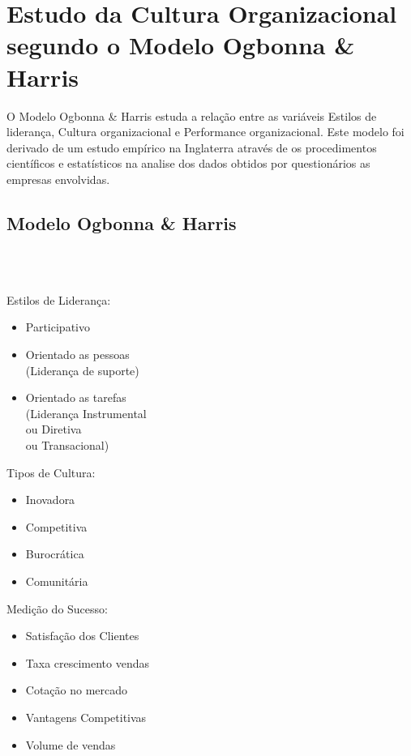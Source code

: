 \section{Estudo da Cultura Organizacional segundo o Modelo Ogbonna \& Harris}
\qquad O Modelo Ogbonna \& Harris estuda a relação entre as variáveis Estilos de liderança, Cultura organizacional e Performance organizacional. Este modelo foi derivado de um estudo empírico na Inglaterra através de os procedimentos científicos e estatísticos na analise dos dados obtidos por questionários as empresas envolvidas.\\
\subsection{Modelo Ogbonna \& Harris}
 \\
\\
\begin{minipage}[t]{.31\linewidth}
\quad Estilos de Liderança:
\begin{itemize}
\setlength\itemsep{-0.3em}
\item Participativo
\item Orientado as pessoas\\
(Liderança de suporte)
\item Orientado as tarefas\\
(Liderança Instrumental\\ ou Diretiva\\ ou Transacional)
\end{itemize}
\end{minipage}
\begin{minipage}[t]{.31\linewidth}
\quad Tipos de Cultura:
\begin{itemize}
\setlength\itemsep{-0.3em}
\item Inovadora
\item Competitiva
\item Burocrática
\item Comunitária
\end{itemize}
\end{minipage}
\begin{minipage}[t]{.31\linewidth}
\quad Medição do Sucesso:
\begin{itemize}
\setlength\itemsep{-0.3em}
\item Satisfação dos Clientes
\item Taxa crescimento vendas
\item Cotação no mercado
\item Vantagens Competitivas
\item Volume de vendas
\end{itemize}
\end{minipage}
